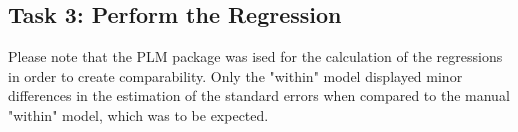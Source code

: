 \documentclass[a4paper]{article}
\begin{document}
\subsection{Task 3: Perform the Regression}

Please note that the PLM package was ised for the calculation of the regressions in order to create comparability. Only the "within" model displayed minor differences in the estimation of the standard errors when compared to the manual "within" model, which was to be expected.



\end{document}
